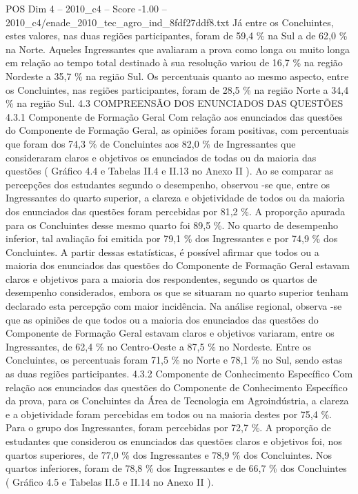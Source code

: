 \begin{textsample}{POS Dim 4 – 2010\_c4 – Score -1.00 – 2010\_c4/enade\_2010\_tec\_agro\_ind\_8fdf27ddf8.txt}
Já entre os Concluintes, estes valores, nas duas regiões participantes, foram de 59,4 \% na Sul a de 62,0 \% na Norte.
Aqueles Ingressantes que avaliaram a prova como longa ou muito longa em relação ao tempo total destinado à sua resolução variou de 16,7 \% na região Nordeste a 35,7 \% na região Sul.
Os percentuais quanto ao mesmo aspecto, entre os Concluintes, nas regiões participantes, foram de 28,5 \% na região Norte a 34,4 \% na região Sul. 4.3 COMPREENSÃO DOS ENUNCIADOS DAS QUESTÕES 4.3.1 Componente de Formação Geral Com relação aos enunciados das questões do Componente de Formação Geral, as opiniões foram positivas, com percentuais que foram dos 74,3 \% de Concluintes aos 82,0 \% de Ingressantes que consideraram claros e objetivos os enunciados de todas ou da maioria das questões ( Gráfico 4.4 e Tabelas II.4 e II.13 no Anexo II ).
Ao se comparar as percepções dos estudantes segundo o desempenho, observou -se que, entre os Ingressantes do quarto superior, a clareza e objetividade de todos ou da maioria dos enunciados das questões foram percebidas por 81,2 \%.
A proporção apurada para os Concluintes desse mesmo quarto foi 89,5 \%.
No quarto de desempenho inferior, tal avaliação foi emitida por 79,1 \% dos Ingressantes e por 74,9 \% dos Concluintes.
A partir dessas estatísticas, é possível afirmar que todos ou a maioria dos enunciados das questões do Componente de Formação Geral estavam claros e objetivos para a maioria dos respondentes, segundo os quartos de desempenho considerados, embora os que se situaram no quarto superior tenham declarado esta percepção com maior incidência.
Na análise regional, observa -se que as opiniões de que todos ou a maioria dos enunciados das questões do Componente de Formação Geral estavam claros e objetivos variaram, entre os Ingressantes, de 62,4 \% no Centro-Oeste a 87,5 \% no Nordeste.
Entre os Concluintes, os percentuais foram 71,5 \% no Norte e 78,1 \% no Sul, sendo estas as duas regiões participantes. 4.3.2 Componente de Conhecimento Específico Com relação aos enunciados das questões do Componente de Conhecimento Específico da prova, para os Concluintes da Área de Tecnologia em Agroindústria, a clareza e a objetividade foram percebidas em todos ou na maioria destes por 75,4 \%.
Para o grupo dos Ingressantes, foram percebidas por 72,7 \%.
A proporção de estudantes que considerou os enunciados das questões claros e objetivos foi, nos quartos superiores, de 77,0 \% dos Ingressantes e 78,9 \% dos Concluintes.
Nos quartos inferiores, foram de 78,8 \% dos Ingressantes e de 66,7 \% dos Concluintes ( Gráfico 4.5 e Tabelas II.5 e II.14 no Anexo II ).

\end{textsample}
